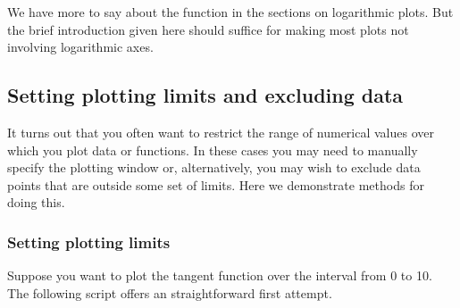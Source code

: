 \documentclass[letterpaper,10pt,english]{sphinxmanual}
\begin{document}
\sphinxAtStartPar
We have more to say about the  function in the sections on  logarithmic plots.  But the brief introduction given here should suffice for making most plots not involving logarithmic axes.


\subsection{Setting plotting limits and excluding data}
\label{\detokenize{chap5/chap5_plot:setting-plotting-limits-and-excluding-data}}
\sphinxAtStartPar
It turns out that you often want to restrict the range of numerical values over which you plot data or functions.  In these cases you may need to manually specify the plotting window or, alternatively, you may wish to exclude data points that are outside some set of limits.  Here we demonstrate methods for doing this.


\subsubsection{Setting plotting limits}
\label{\detokenize{chap5/chap5_plot:setting-plotting-limits}}
\ignorespaces 
\sphinxAtStartPar
Suppose you want to plot the tangent function over the interval from 0 to 10.  The following script offers an straightforward first attempt.

\begin{sphinxVerbatim}[commandchars=\\\{\},numbers=left,firstnumber=1,stepnumber=1]
   
   

    
  

 
\end{sphinxVerbatim}

\begin{figure}[htbp]
\centering

\noindent{}
\end{figure}
\end{document}
